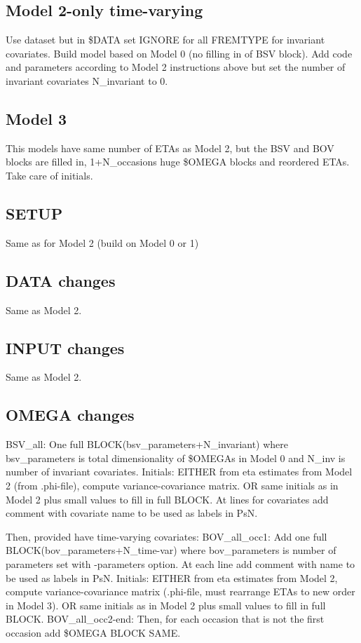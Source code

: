 \documentclass[a4paper,12pt]{article}
\begin{document}
\subsection{Model 2-only time-varying}
Use dataset but in \$DATA set IGNORE for all FREMTYPE for invariant covariates. Build model based on Model 0 (no filling in of BSV block). Add code and parameters according to Model 2 instructions above but set the number of invariant covariates N\_invariant to 0.

\subsection{Model 3}

This models have same number of ETAs as Model 2, but the BSV and BOV blocks are filled in, 1+N\_occasions huge \$OMEGA blocks and reordered ETAs. Take care of initials.

\subsection{SETUP}
Same as for Model 2 (build on Model 0 or 1)

\subsection{DATA changes}
Same as Model 2.
\subsection{INPUT changes}
Same as Model 2.

\subsection{OMEGA changes}
BSV\_all: One full BLOCK(bsv\_parameters+N\_invariant) where bsv\_parameters is total dimensionality of \$OMEGAs in Model 0 and N\_inv is number of invariant covariates.
Initials: EITHER from eta estimates from Model 2 (from .phi-file), compute variance-covariance matrix. OR same initials as in Model 2 plus small values to fill in full BLOCK.
At lines for covariates add comment with covariate name to be used as labels in PsN.

Then, provided have time-varying covariates:
BOV\_all\_occ1: Add one full BLOCK(bov\_parameters+N\_time-var) where bov\_parameters is number of parameters set with -parameters option.
At each line add comment with name to be used as labels in PsN.
Initials: EITHER from eta estimates from Model 2, compute variance-covariance matrix (.phi-file, must rearrange ETAs to new order in Model 3). OR same initials as in Model 2 plus small values to fill in full BLOCK.
BOV\_all\_occ2-end: Then, for each occasion that is not the first occasion add \$OMEGA BLOCK SAME.
\end{document}
